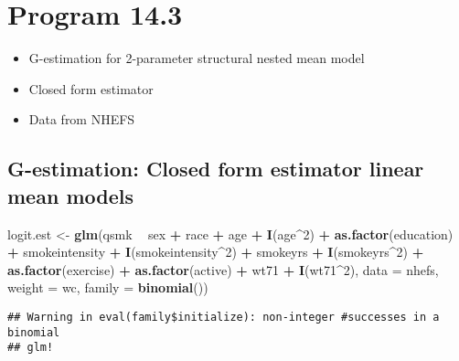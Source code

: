 \documentclass[10pt,]{book}
\newenvironment{Shaded}{\begin{snugshade}}{\end{snugshade}}
\newcommand{\DataTypeTok}[1]{\textcolor[rgb]{0.13,0.29,0.53}{#1}}
\newcommand{\DecValTok}[1]{\textcolor[rgb]{0.00,0.00,0.81}{#1}}
\newcommand{\KeywordTok}[1]{\textcolor[rgb]{0.13,0.29,0.53}{\textbf{#1}}}
\newcommand{\NormalTok}[1]{#1}
\newcommand{\OperatorTok}[1]{\textcolor[rgb]{0.81,0.36,0.00}{\textbf{#1}}}
\newcommand{\StringTok}[1]{\textcolor[rgb]{0.31,0.60,0.02}{#1}}
\providecommand{\tightlist}{%
  \setlength{\itemsep}{0pt}\setlength{\parskip}{0pt}}
\begin{document}
\hypertarget{program-14.3}{%
\section{Program 14.3}\label{program-14.3}}

\begin{itemize}
\tightlist
\item
  G-estimation for 2-parameter structural nested mean model
\item
  Closed form estimator
\item
  Data from NHEFS
\end{itemize}

\hypertarget{g-estimation-closed-form-estimator-linear-mean-models}{%
\subsection{G-estimation: Closed form estimator linear mean models}\label{g-estimation-closed-form-estimator-linear-mean-models}}

\begin{Shaded}
\begin{Highlighting}[]
\NormalTok{logit.est <-}\StringTok{ }\KeywordTok{glm}\NormalTok{(qsmk }\OperatorTok{~}\StringTok{ }\NormalTok{sex }\OperatorTok{+}\StringTok{ }\NormalTok{race }\OperatorTok{+}\StringTok{ }\NormalTok{age }\OperatorTok{+}\StringTok{ }\KeywordTok{I}\NormalTok{(age}\OperatorTok{^}\DecValTok{2}\NormalTok{) }\OperatorTok{+}\StringTok{ }\KeywordTok{as.factor}\NormalTok{(education) }
                 \OperatorTok{+}\StringTok{ }\NormalTok{smokeintensity }\OperatorTok{+}\StringTok{ }\KeywordTok{I}\NormalTok{(smokeintensity}\OperatorTok{^}\DecValTok{2}\NormalTok{) }\OperatorTok{+}\StringTok{ }\NormalTok{smokeyrs }
                 \OperatorTok{+}\StringTok{ }\KeywordTok{I}\NormalTok{(smokeyrs}\OperatorTok{^}\DecValTok{2}\NormalTok{) }\OperatorTok{+}\StringTok{ }\KeywordTok{as.factor}\NormalTok{(exercise) }\OperatorTok{+}\StringTok{ }\KeywordTok{as.factor}\NormalTok{(active) }
                 \OperatorTok{+}\StringTok{ }\NormalTok{wt71 }\OperatorTok{+}\StringTok{ }\KeywordTok{I}\NormalTok{(wt71}\OperatorTok{^}\DecValTok{2}\NormalTok{), }\DataTypeTok{data =}\NormalTok{ nhefs, }\DataTypeTok{weight =}\NormalTok{ wc, }
                 \DataTypeTok{family =} \KeywordTok{binomial}\NormalTok{())}
\end{Highlighting}
\end{Shaded}

\begin{verbatim}
## Warning in eval(family$initialize): non-integer #successes in a binomial
## glm!
\end{verbatim}
\end{document}
